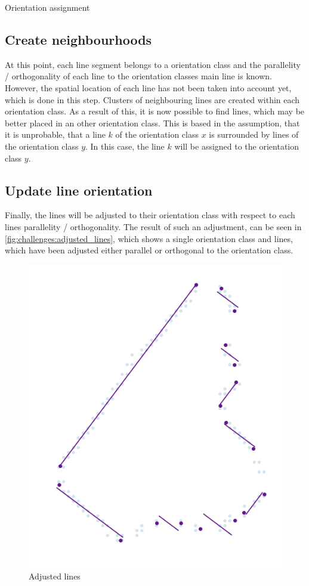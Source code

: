 \begin{algorithm}[H]
\caption{Orientation assignment}
\label{alg:challenges:define_orientations} 
\end{algorithm}

\subsection{Create neighbourhoods}
At this point, each line segment belongs to a orientation class and the parallelity / orthogonality of each line to the orientation classes main line is known. However, the spatial location of each line has not been taken into account yet, which is done in this step. Clusters of neighbouring lines are created within each orientation class. As a result of this, it is now possible to find lines, which may be better placed in an other orientation class. This is based in the assumption, that it is unprobable, that a line $k$ of the orientation class $x$ is surrounded by lines of the orientation class $y$. In this case, the line $k$ will be assigned to the orientation class $y$.

\subsection{Update line orientation}
Finally, the lines will be adjusted to their orientation class with respect to each lines parallelity / orthogonality. The result of such an adjustment, can be seen in \autoref{fig:challenges:adjusted_lines}, which shows a single orientation class and lines, which have been adjusted either parallel or orthogonal to the orientation class.

\begin{figure}[H]
    \centering
	\includegraphics[width=0.4\linewidth]{chapters/challenges/images/adjusted_lines.png}
	\caption{Adjusted lines}
	\label{fig:challenges:adjusted_lines}
\end{figure}

